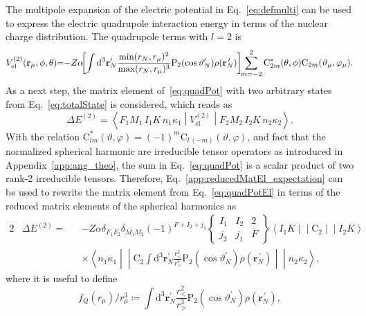 The multipole expansion of the electric potential in Eq.~\eqref{eq:defmulti} can be used to express the electric quadrupole interaction energy in terms of the nuclear charge distribution. The quadrupole terms with $l=2$ is
\begin{equation}
V^{(2)}_{\text{el}}(\mathbf{r}_\mu,\phi,\theta)\hspace{-3pt}=\hspace{-3pt}-Z\alpha\hspace{-4pt} \left[ \int \text{d}^3\mathbf{r}^{\prime}_N \frac{\min(r_N,r_\mu)^2}{\max(r_N,r_\mu)^{3}}\text{P}_{2}(\cos \vartheta_N^{\prime})\rho(\mathbf{r}_N^{\,\prime})\right]\hspace{-3pt}\sum_{m=-2}^2 \text{C}^*_{2m}(\theta,\phi)\text{C}_{2m}(\vartheta_\mu,\varphi_\mu).
\label{eq:quadPot}
\end{equation}
As a next step, the matrix element of~\eqref{eq:quadPot} with two arbitrary states from Eq.~\eqref{eq:totalState} is considered, which reads as
\begin{equation}
\Delta E^{(2)}=\left<F_1M_1\,I_1K \,n_1\kappa_1 \middle| V^{(2)}_{\text{el}} \middle|F_2M_2\,I_2K \,n_2\kappa_2 \right>.
\label{eq:quadPotEl}
\end{equation}
With the relation $\text{C}_{lm}^*(\vartheta,\varphi) =(-1)^m\text{C}_{l\,(-m)}(\vartheta,\varphi)$, and fact that the normalized spherical harmonic are irreducible tensor operators as introduced in Appendix~\ref{app:ang_theo}, the sum in Eq.~\eqref{eq:quadPot} is a scalar product of two rank-2 irreducible tensors. Therefore, Eq.~\eqref{app:reducedMatEl_expectation} can be used to rewrite the matrix element from Eq.~\eqref{eq:quadPotEl} in terms of the reduced matrix elements of the spherical harmonics as
\begin{alignat}{2}
&\Delta E^{(2)} =&& -Z\alpha\delta_{F_1F_2}\delta_{M_1M_2} (-1)^{F+I_2+j_1}
\begin{Bmatrix}
I_1 & I_2 & 2 \\
j_2 & j_1&F
\end{Bmatrix}
\left<I_1K\middle|\middle|\text{C}_2 \middle|\middle| I_2 K \right>\\[7.5pt]
&&&\times\left<n_1\kappa_1\middle|\middle|\text{C}_2  \int \text{d}^3\mathbf{r}^{\prime}_N \frac{r_<^2}{r_>^{3}}\text{P}_{2}(\cos \vartheta_N^{\prime})\rho(\mathbf{r}_N^{\,\prime}) \middle|\middle| n_2\kappa_2 \right>,
\label{eq:quadNonDiagEl}
\end{alignat}
where it is useful to define
\begin{equation}
\label{eq:quadDistr}
f_Q(r_\mu)/r_\mu^3 \coloneqq \int \text{d}^3\mathbf{r}^{\prime}_N \frac{r_<^2}{r_>^{3}}\text{P}_{2}(\cos \vartheta_N^{\prime})\rho(\mathbf{r}_N^{\,\prime}),
\end{equation}
